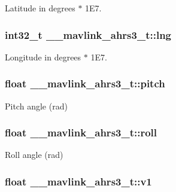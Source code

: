 Latitude in degrees $\ast$ 1\+E7. 

\hypertarget{struct____mavlink__ahrs3__t_aa840cc075de9dc3056cd5b3712318143}{
\subsubsection[{lng}]{\setlength{\rightskip}{0pt plus 5cm}int32\+\_\+t \+\_\+\+\_\+mavlink\+\_\+ahrs3\+\_\+t\+::lng}}\label{struct____mavlink__ahrs3__t_aa840cc075de9dc3056cd5b3712318143}


Longitude in degrees $\ast$ 1\+E7. 

\hypertarget{struct____mavlink__ahrs3__t_a24195c2ab85c487133f52fca56fff7b2}{
\subsubsection[{pitch}]{\setlength{\rightskip}{0pt plus 5cm}float \+\_\+\+\_\+mavlink\+\_\+ahrs3\+\_\+t\+::pitch}}\label{struct____mavlink__ahrs3__t_a24195c2ab85c487133f52fca56fff7b2}


Pitch angle (rad) 

\hypertarget{struct____mavlink__ahrs3__t_ad54d74528fa2a52bd8aeaa1a17a8eb30}{
\subsubsection[{roll}]{\setlength{\rightskip}{0pt plus 5cm}float \+\_\+\+\_\+mavlink\+\_\+ahrs3\+\_\+t\+::roll}}\label{struct____mavlink__ahrs3__t_ad54d74528fa2a52bd8aeaa1a17a8eb30}


Roll angle (rad) 

\hypertarget{struct____mavlink__ahrs3__t_a17bb34e1ad16f876065e11f3f4efaa1b}{
\subsubsection[{v1}]{\setlength{\rightskip}{0pt plus 5cm}float \+\_\+\+\_\+mavlink\+\_\+ahrs3\+\_\+t\+::v1}}\label{struct____mavlink__ahrs3__t_a17bb34e1ad16f876065e11f3f4efaa1b}


